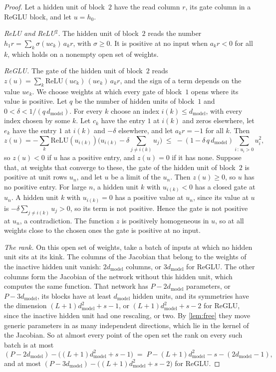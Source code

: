 \documentclass[10pt]{article}
\theoremstyle{definition}
\theoremstyle{remark}
\newcommand{\dm}{d_{\mathrm{model}}}
\begin{document}
\begin{proof}
Let a hidden unit of block~$2$ have the read column $r$, its gate column in a ReGLU block, and let $u = h_0$.

\emph{ReLU and ReLU$^2$.} The hidden unit of block~$2$ reads the number $h_1r = \sum_k \sigma(uc_k)\,a_kr$, with $\sigma \ge 0$. It is positive at no input when $a_kr < 0$ for all $k$, which holds on a nonempty open set of weights.

\emph{ReGLU.} The gate of the hidden unit of block~$2$ reads $z(u) = \sum_k \mathrm{ReLU}(uc_k)\,(ue_k)\,a_kr$, and the sign of a term depends on the value $ue_k$. We choose weights at which every gate of block~$1$ opens where its value is positive. Let $q$ be the number of hidden units of block~$1$ and $0 < \delta < 1/(q\,\dm)$. For every $k$ choose an index $i(k) \le \dm$, with every index chosen by some $k$. Let $c_k$ have the entry $1$ at $i(k)$ and zeros elsewhere, let $e_k$ have the entry $1$ at $i(k)$ and $-\delta$ elsewhere, and let $a_kr = -1$ for all $k$. Then
\[
z(u) = -\sum_k \mathrm{ReLU}(u_{i(k)})\Big(u_{i(k)} - \delta\sum_{j \neq i(k)}u_j\Big) \;\le\; -(1 - \delta\,q\,\dm)\sum_{i\,:\,u_i > 0}u_i^2 ,
\]
so $z(u) < 0$ if $u$ has a positive entry, and $z(u) = 0$ if it has none. Suppose that, at weights that converge to these, the gate of the hidden unit of block~$2$ is positive at unit rows $u_n$, and let $u$ be a limit of the $u_n$. Then $z(u) \ge 0$, so $u$ has no positive entry. For large $n$, a hidden unit $k$ with $u_{i(k)} < 0$ has a closed gate at $u_n$. A hidden unit $k$ with $u_{i(k)} = 0$ has a positive value at $u_n$, since its value at $u$ is $-\delta\sum_{j \neq i(k)}u_j > 0$, so its term is not positive. Hence the gate is not positive at $u_n$, a contradiction. The function $z$ is positively homogeneous in $u$, so at all weights close to the chosen ones the gate is positive at no input.

\emph{The rank.} On this open set of weights, take a batch of inputs at which no hidden unit sits at its kink. The columns of the Jacobian that belong to the weights of the inactive hidden unit vanish: $2\dm$ columns, or $3\dm$ for ReGLU. The other columns form the Jacobian of the network without this hidden unit, which computes the same function. That network has $P - 2\dm$ parameters, or $P - 3\dm$, its blocks have at least $\dm$ hidden units, and its symmetries have the dimension $(L+1)\dm^2 + s - 1$, or $(L+1)\dm^2 + s - 2$ for ReGLU, since the inactive hidden unit had one rescaling, or two. By \cref{lem:free} they move generic parameters in as many independent directions, which lie in the kernel of the Jacobian. So at almost every point of the open set the rank on every such batch is at most
\[
(P - 2\dm) - \big((L+1)\dm^2 + s - 1\big) \;=\; P - (L+1)\dm^2 - s - (2\dm - 1),
\]
and at most $(P - 3\dm) - \big((L+1)\dm^2 + s - 2\big)$ for ReGLU.
\end{proof}
\end{document}
